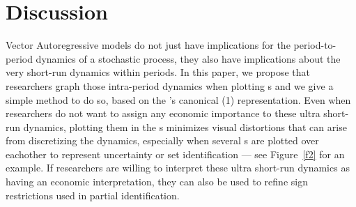 \documentclass[12pt,fleqn]{article}
\begin{document}
\section{Discussion}

Vector Autoregressive models do not just have implications for the
period-to-period dynamics of a stochastic process, they also have
implications about the very short-run dynamics within periods. In this
paper, we propose that researchers graph those intra-period dynamics
when plotting \IRF s and we give a simple method to do so, based on
the \VAR's canonical \VAR(1) representation. Even when researchers do
not want to assign any economic importance to these ultra short-run
dynamics, plotting them in the \IRF s minimizes visual distortions
that can arise from discretizing the dynamics, especially when several
\IRF s are plotted over eachother to represent uncertainty or set
identification --- see Figure~\ref{f2} for an example. If researchers
are willing to interpret these ultra short-run dynamics as having an
economic interpretation, they can also be used to refine sign
restrictions used in partial identification.


\end{document}
